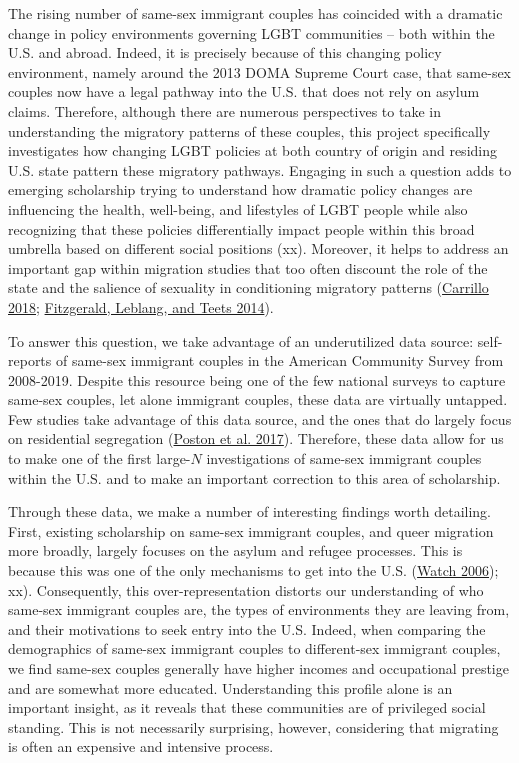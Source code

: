 \documentclass[
  11pt,
]{article}
\begin{document}
The rising number of same-sex immigrant couples has coincided with a dramatic change in policy environments governing LGBT communities -- both within the U.S. and abroad. Indeed, it is precisely because of this changing policy environment, namely around the 2013 DOMA Supreme Court case, that same-sex couples now have a legal pathway into the U.S. that does not rely on asylum claims. Therefore, although there are numerous perspectives to take in understanding the migratory patterns of these couples, this project specifically investigates how changing LGBT policies at both country of origin and residing U.S. state pattern these migratory pathways. Engaging in such a question adds to emerging scholarship trying to understand how dramatic policy changes are influencing the health, well-being, and lifestyles of LGBT people while also recognizing that these policies differentially impact people within this broad umbrella based on different social positions (xx). Moreover, it helps to address an important gap within migration studies that too often discount the role of the state and the salience of sexuality in conditioning migratory patterns (\protect\hyperlink{ref-carrillo_2018}{Carrillo 2018}; \protect\hyperlink{ref-fitzgerald_2014}{Fitzgerald, Leblang, and Teets 2014}).

To answer this question, we take advantage of an underutilized data source: self-reports of same-sex immigrant couples in the American Community Survey from 2008-2019. Despite this resource being one of the few national surveys to capture same-sex couples, let alone immigrant couples, these data are virtually untapped. Few studies take advantage of this data source, and the ones that do largely focus on residential segregation (\protect\hyperlink{ref-poston_2017}{Poston et al. 2017}). Therefore, these data allow for us to make one of the first large-\(N\) investigations of same-sex immigrant couples within the U.S. and to make an important correction to this area of scholarship.

Through these data, we make a number of interesting findings worth detailing. First, existing scholarship on same-sex immigrant couples, and queer migration more broadly, largely focuses on the asylum and refugee processes. This is because this was one of the only mechanisms to get into the U.S. (\protect\hyperlink{ref-humanrightswatch_2006}{Watch 2006}); xx). Consequently, this over-representation distorts our understanding of who same-sex immigrant couples are, the types of environments they are leaving from, and their motivations to seek entry into the U.S. Indeed, when comparing the demographics of same-sex immigrant couples to different-sex immigrant couples, we find same-sex couples generally have higher incomes and occupational prestige and are somewhat more educated. Understanding this profile alone is an important insight, as it reveals that these communities are of privileged social standing. This is not necessarily surprising, however, considering that migrating is often an expensive and intensive process.
\end{document}
